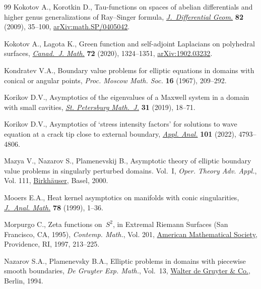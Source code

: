 \documentclass[pdftex]{sigma}
\numberwithin{equation}{section}
\theoremstyle{definition}
\begin{document}
\begin{thebibliography}{99}
Kokotov A., Korotkin D., Tau-functions on spaces of abelian differentials and
 higher genus generalizations of {R}ay--{S}inger formula,
 \href{https://doi.org/10.4310/jdg/1242134368}{\textit{J.~Differential Geom.}}
 \textbf{82} (2009), 35--100,
 \href{http://arxiv.org/abs/math.SP/0405042}{arXiv:math.SP/0405042}.

Kokotov A., Lagota K., Green function and self-adjoint {L}aplacians on
 polyhedral surfaces,
 \href{https://doi.org/10.4153/s0008414x19000336}{\textit{Canad.~J. Math.}}
 \textbf{72} (2020), 1324--1351,
 \href{http://arxiv.org/abs/1902.03232}{arXiv:1902.03232}.

Kondratev V.A., Boundary value problems for elliptic equations in domains with
 conical or angular points, \textit{Proc. Moscow Math. Soc.} \textbf{16}
 (1967), 209--292.

Korikov D.V., Asymptotics of the eigenvalues of a {M}axwell system in a domain
 with small cavities, \href{https://doi.org/10.1090/spmj/1582}{\textit{St.
 Petersburg Math.~J.}} \textbf{31} (2019), 18--71.

Korikov D.V., Asymptotics of `stress intensity factors' for solutions to wave
 equation at a crack tip close to external boundary,
 \href{https://doi.org/10.1080/00036811.2020.1869946}{\textit{Appl. Anal.}}
 \textbf{101} (2022), 4793--4806.

Mazya V., Nazarov S., Plamenevskij B., Asymptotic theory of elliptic boundary
 value problems in singularly perturbed domains. {V}ol.~{I}, \textit{Oper.
 Theory Adv. Appl.}, Vol. 111,
 \href{https://doi.org/10.1007/978-3-0348-8434-1}{Birkh\"auser}, Basel, 2000.

Mooers E.A., Heat kernel asymptotics on manifolds with conic singularities,
 \href{https://doi.org/10.1007/BF02791127}{\textit{J.~Anal. Math.}}
 \textbf{78} (1999), 1--36.

Morpurgo C., Zeta functions on~{$S^2$}, in Extremal {R}iemann {S}urfaces ({S}an
 {F}rancisco, {CA}, 1995), \textit{Contemp. Math.}, Vol. 201,
 \href{https://doi.org/10.1090/conm/201/02611}{American Mathematical Society},
 Providence, RI, 1997, 213--225.

Nazarov S.A., Plamenevsky B.A., Elliptic problems in domains with piecewise
 smooth boundaries, \textit{De Gruyter Exp. Math.}, Vol.~13,
 \href{https://doi.org/10.1515/9783110848915.525}{Walter de Gruyter \& Co.},
 Berlin, 1994.


\end{thebibliography}
\end{document}
